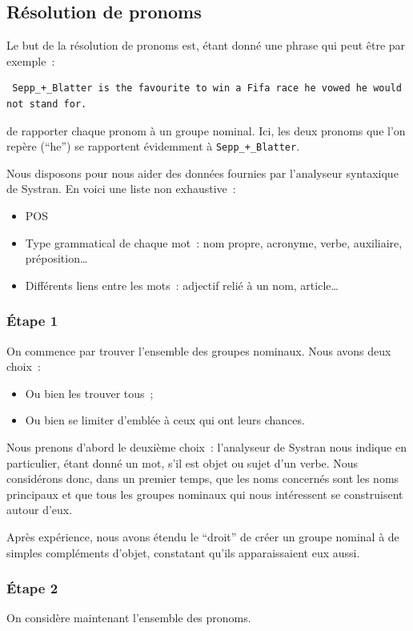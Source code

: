 \documentclass[a4paper, 12pt]{article}
\begin{document}
\subsection{Résolution de pronoms}

Le but de la résolution de pronoms est, étant donné une phrase qui peut être par exemple~:

\begin{verbatim}
 Sepp_+_Blatter is the favourite to win a Fifa race he vowed he would not stand for.
\end{verbatim}
de rapporter chaque pronom à un groupe nominal. Ici, les deux pronoms que l'on repère (``he'') se rapportent évidemment à \verb|Sepp_+_Blatter|.

Nous disposons pour nous aider des données fournies par l'analyseur syntaxique de Systran. En voici une liste non exhaustive~:
\begin{itemize}
 \item POS
 \item Type grammatical de chaque mot~: nom propre, acronyme, verbe, auxiliaire, préposition\ldots{}
 \item Différents liens entre les mots~: adjectif relié à un nom, article\ldots{}
\end{itemize}


\subsubsection{Étape 1}
On commence par trouver l'ensemble des groupes nominaux. Nous avons deux choix~:
\begin{itemize}
 \item Ou bien les trouver tous~;
 \item Ou bien se limiter d'emblée à ceux qui ont leurs chances.
\end{itemize}

Nous prenons d'abord le deuxième choix~: l'analyseur de Systran nous indique en particulier, étant donné un mot, s'il est objet ou sujet d'un verbe. Nous considérons donc, dans un premier temps, que les noms concernés sont les noms principaux et que tous les groupes nominaux qui nous intéressent se construisent autour d'eux.

Après expérience, nous avons étendu le ``droit'' de créer un groupe nominal à de simples compléments d'objet, constatant qu'ils apparaissaient eux aussi.


\subsubsection{Étape 2}
On considère maintenant l'ensemble des pronoms.
\end{document}
